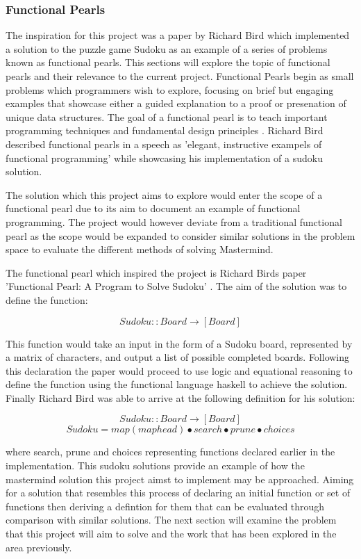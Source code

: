 \documentclass[12pt]{article}  %
\theoremstyle{definition}
\theoremstyle{remark}
\begin{document}
\subsubsection {Functional Pearls}
The inspiration for this project was a paper by Richard Bird which implemented a solution to the puzzle game Sudoku as an example of a series of problems known as functional pearls. This sections will explore the topic of functional pearls and their relevance to the current project. Functional Pearls begin as small problems which programmers wish to explore, focusing on brief but engaging examples that showcase either a guided explanation to a proof or presenation of unique data structures. The goal of a functional pearl is to teach important programming techniques and fundamental design principles \cite{Pearls}.  Richard Bird described functional pearls in a speech as 'elegant, instructive exampels of functional programming' while showcasing his implementation of a sudoku solution\cite {R. Bird Speech}.

The solution which this project aims to explore would enter the scope of a functional pearl due to its aim to document an example of functional programming. The project would however deviate from a traditional functional pearl as the scope would be expanded to consider similar solutions in the problem space to evaluate the different methods of solving Mastermind.

The functional pearl which inspired the project is Richard Birds paper 'Functional Pearl: A Program to Solve Sudoku' \cite{Sudoku}. The aim of the solution was to define the function:

\[ Sudoku :: Board \rightarrow [Board]\]

This function would take an input in the form of a Sudoku board, represented by a matrix of characters, and output a list of possible completed boards. Following this declaration the paper would proceed to use logic and equational reasoning to define the function using the functional language haskell to achieve the solution. Finally Richard Bird was able to arrive at the following definition for his solution:

\[ Sudoku :: Board \rightarrow [Board]\]
\[ Sudoku = map (map head) \bullet search \bullet prune \bullet choices\]

where search, prune and choices representing functions declared earlier in the implementation. This sudoku solutions provide an example of how the mastermind solution this project aimst to implement may be approached. Aiming for a solution that resembles this process of declaring an initial function or set of functions then deriving a defintion for them that can be evaluated through comparison with similar solutions. The next section will examine the problem that this project will aim to solve and the work that has been explored in the area previously.
\end{document}
